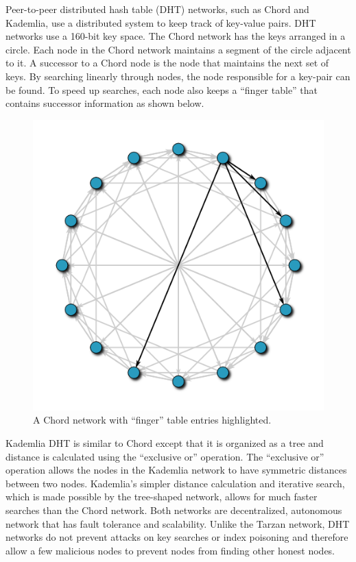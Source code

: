 Peer-to-peer distributed hash table (DHT) networks, such as Chord and Kademlia, use a distributed system to keep track of key-value pairs. DHT networks use a 160-bit key space. The Chord network has the keys arranged in a circle. Each node in the Chord network maintains a segment of the circle adjacent to it. A successor to a Chord node is the node that maintains the next set of keys. By searching linearly through nodes, the node responsible for a key-pair can be found. To speed up searches, each node also keeps a “finger table” that contains successor information as shown below.

\begin{figure}[ht!]
\begin{center}
\includegraphics[scale=0.5]{./images/chord.png}
\caption{A Chord network with ``finger'' table entries highlighted.}
\label{fig:chord}
\end{center}
\end{figure}

Kademlia DHT is similar to Chord except that it is organized as a tree and distance is calculated using the “exclusive or” operation. The “exclusive or” operation allows the nodes in the Kademlia network to have symmetric distances between two nodes. Kademlia's simpler distance calculation and iterative search, which is made possible by the tree-shaped network, allows for much faster searches than the Chord network. Both networks are decentralized, autonomous network that has fault tolerance and scalability. Unlike the Tarzan network, DHT networks do not prevent attacks on key searches or index poisoning and therefore allow a few malicious nodes to prevent nodes from finding other honest nodes.